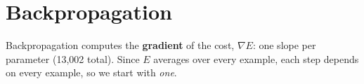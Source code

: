 \section*{Backpropagation}

\newcommand{\nudge}[5]{%
  \pgfmathsetmacro{\nudgeL}{#4*(#3)}%
  \pgfmathsetmacro{\nudgeA}{#2-\nudgeL/2}%
  \pgfmathsetmacro{\nudgeB}{#2+\nudgeL/2}%
  \ifdim \nudgeL pt>0.001pt
    \draw[-stealth, blue!70!black, line width=#5] (#1,\nudgeA) -- (#1,\nudgeB);
  \else\ifdim \nudgeL pt<-0.001pt
    \draw[-stealth, red!80!black, line width=#5] (#1,\nudgeA) -- (#1,\nudgeB);
  \fi\fi}

Backpropagation computes the \textbf{gradient} of the cost, $\nabla E$: one slope per parameter (13{,}002 total). Since $E$ averages over every example, each step depends on every example, so we start with \textit{one}.

